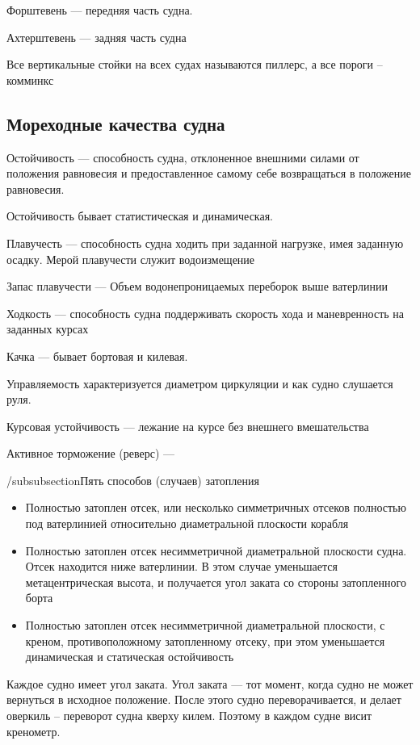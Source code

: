 \documentclass{article}        %
\begin{document}
Форштевень --- передняя часть судна.

Ахтерштевень --- задняя часть судна

Все вертикальные стойки на всех судах называются пиллерс, а все пороги -- комминкс




\subsection{Мореходные качества судна}
Остойчивость --- способность судна, отклоненное внешними силами от положения равновесия
	и предоставленное самому себе возвращаться в положение равновесия.

Остойчивость бывает статистическая и динамическая.

Плавучесть --- способность судна ходить при заданной нагрузке, имея заданную осадку.
Мерой плавучести служит водоизмещение

Запас плавучести --- Объем водонепроницаемых переборок выше ватерлинии

Ходкость --- способность судна поддерживать скорость хода и маневренность на заданных курсах

Качка --- бывает бортовая и килевая.

Управляемость характеризуется диаметром циркуляции и как судно слушается руля.

Курсовая устойчивость --- лежание на курсе без внешнего вмешательства

Активное торможение (реверс) --- 

/subsubsection{Пять способов (случаев) затопления}
\begin{itemize}
	\item Полностью затоплен отсек, или несколько симметричных отсеков полностью под ватерлинией относительно диаметральной плоскости корабля
	\item Полностью затоплен отсек несимметричной диаметральной плоскости судна. Отсек находится ниже ватерлинии. В этом случае уменьшается метацентрическая высота, и получается угол заката со стороны затопленного борта
	\item Полностью затоплен отсек несимметричной диаметральной плоскости, с креном, противоположному затопленному отсеку, при этом уменьшается динамическая и статическая остойчивость
\end{itemize}

Каждое судно имеет угол заката. 
Угол заката --- тот момент, когда судно не может вернуться в исходное положение. После этого судно переворачивается, и делает оверкиль -- переворот судна кверху килем.
Поэтому в каждом судне висит кренометр.
\end{document}
